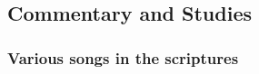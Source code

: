 	
\subsection{Commentary and Studies} %
	\label{SONG-COMMENTARY}

	
		
	\subsubsection{Various songs in the scriptures}
		\label{SONG-scriptures}
		
